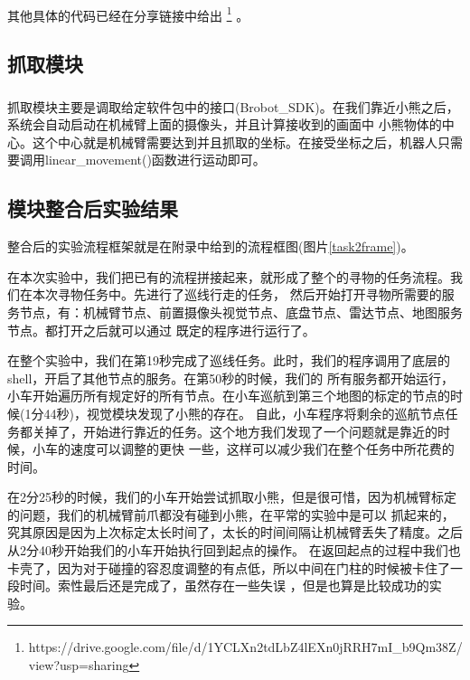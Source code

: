 \documentclass[a4paper,twoside]{article}
\newcommand{\upcite}[1]{\textsuperscript{\textsuperscript{\cite{#1}}}}
\begin{document}
\paragraph*{}其他具体的代码已经在分享链接中给出 \footnote{https://drive.google.com/file/d/1YCLXn2tdLbZ4lEXn0jRRH7mI\_b9Qm38Z/view?usp=sharing} 。

\subsection{抓取模块}
抓取模块主要是调取给定软件包中的接口(Brobot\_SDK)\upcite{document}。在我们靠近小熊之后，系统会自动启动在机械臂上面的摄像头，并且计算接收到的画面中
小熊物体的中心。这个中心就是机械臂需要达到并且抓取的坐标。在接受坐标之后，机器人只需要调用linear\_movement()函数进行运动即可。
\subsection{模块整合后实验结果}
整合后的实验流程框架就是在附录中给到的流程框图(图片\ref*{task2frame})。

在本次实验中，我们把已有的流程拼接起来，就形成了整个的寻物的任务流程。我们在本次寻物任务中。先进行了巡线行走的任务，
然后开始打开寻物所需要的服务节点，有：机械臂节点、前置摄像头视觉节点、底盘节点、雷达节点、地图服务节点。都打开之后就可以通过
既定的程序进行运行了。

在整个实验中，我们在第19秒完成了巡线任务。此时，我们的程序调用了底层的shell，开启了其他节点的服务。在第50秒的时候，我们的
所有服务都开始运行，小车开始遍历所有规定好的所有节点。在小车巡航到第三个地图的标定的节点的时候(1分44秒)，视觉模块发现了小熊的存在。
自此，小车程序将剩余的巡航节点任务都关掉了，开始进行靠近的任务。这个地方我们发现了一个问题就是靠近的时候，小车的速度可以调整的更快
一些，这样可以减少我们在整个任务中所花费的时间。

在2分25秒的时候，我们的小车开始尝试抓取小熊，但是很可惜，因为机械臂标定的问题，我们的机械臂前爪都没有碰到小熊，在平常的实验中是可以
抓起来的，究其原因是因为上次标定太长时间了，太长的时间间隔让机械臂丢失了精度。之后从2分40秒开始我们的小车开始执行回到起点的操作。
在返回起点的过程中我们也卡壳了，因为对于碰撞的容忍度调整的有点低，所以中间在门柱的时候被卡住了一段时间。索性最后还是完成了，虽然存在一些失误
，但是也算是比较成功的实验。
\end{document}
